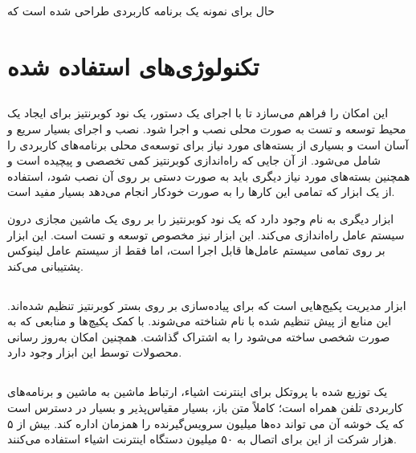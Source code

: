 حال برای نمونه یک برنامه کاربردی طراحی شده است که


\section{تکنولوژی‌های استفاده شده}

\subsection{}

 این امکان را فراهم می‌سازد تا با اجرای یک دستور، یک نود کوبرنتیز برای ایجاد یک محیط توسعه و تست به صورت محلی نصب و اجرا شود. نصب و اجرای  بسیار سریع و آسان است و بسیاری از بسته‌های مورد نیاز برای توسعه‌ی محلی برنامه‌های کاربردی را شامل می‌شود. از آن جایی که راه‌اندازی کوبرنتیز کمی تخصصی و پیچیده است و همچنین بسته‌های مورد نیاز دیگری باید به صورت دستی بر روی آن نصب شود، استفاده از یک ابزار که تمامی این کارها را به صورت خودکار انجام می‌دهد بسیار مفید است.

ابزار دیگری به نام  وجود دارد که یک نود کوبرنتیز را بر روی یک ماشین مجازی درون سیستم عامل راه‌اندازی می‌کند. این ابزار نیز مخصوص توسعه و تست است. این ابزار بر روی تمامی سیستم عامل‌ها قابل اجرا است، اما  فقط از سیستم عامل لینوکس پشتیبانی می‌کند.

\subsection{}

ابزار مدیریت پکیج‌هایی است که برای پیاده‌سازی بر روی بستر کوبرنتیز تنظیم شده‌اند. این منابع از پیش تنظیم شده با نام  شناخته می‌شوند. با کمک  پکیچ‌ها و منابعی که به صورت شخصی ساخته می‌شود را به اشتراک گذاشت. همچنین امکان به‌روز رسانی محصولات توسط این ابزار وجود دارد. 	


\subsection{}

 یک  توزیع شده با پروتکل  برای اینترنت اشیاء، ارتباط ماشین به ماشین و برنامه‌های کاربردی تلفن همراه است؛ کاملاً متن باز، بسیار مقیاس‌پذیر و بسیار در دسترس است که یک خوشه آن می تواند ده‌ها میلیون سرویس‌گیرنده را همزمان اداره کند. بیش از ۵ هزار شرکت از این  برای اتصال به ۵۰ میلیون دستگاه اینترنت اشیاء استفاده می‌کنند.

